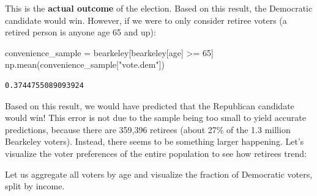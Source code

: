 \documentclass[
  letterpaper,
  DIV=11,
  numbers=noendperiod]{scrreprt}
\newenvironment{Shaded}{\begin{snugshade}}{\end{snugshade}}
\newcommand{\DecValTok}[1]{\textcolor[rgb]{0.68,0.00,0.00}{#1}}
\newcommand{\NormalTok}[1]{\textcolor[rgb]{0.00,0.23,0.31}{#1}}
\newcommand{\OperatorTok}[1]{\textcolor[rgb]{0.37,0.37,0.37}{#1}}
\newcommand{\StringTok}[1]{\textcolor[rgb]{0.13,0.47,0.30}{#1}}
\begin{document}
This is the \textbf{actual outcome} of the election. Based on this
result, the Democratic candidate would win. However, if we were to only
consider retiree voters (a retired person is anyone age 65 and up):

\begin{Shaded}
\begin{Highlighting}[]
\NormalTok{convenience\_sample }\OperatorTok{=}\NormalTok{ bearkeley[bearkeley[}\StringTok{\textquotesingle{}age\textquotesingle{}}\NormalTok{] }\OperatorTok{\textgreater{}=} \DecValTok{65}\NormalTok{]}
\NormalTok{np.mean(convenience\_sample[}\StringTok{"vote.dem"}\NormalTok{])}
\end{Highlighting}
\end{Shaded}

\begin{verbatim}
0.3744755089093924
\end{verbatim}

Based on this result, we would have predicted that the Republican
candidate would win! This error is not due to the sample being too small
to yield accurate predictions, because there are 359,396 retirees (about
27\% of the 1.3 million Bearkeley voters). Instead, there seems to be
something larger happening. Let's visualize the voter preferences of the
entire population to see how retirees trend:

Let us aggregate all voters by age and visualize the fraction of
Democratic voters, split by income.
\end{document}
